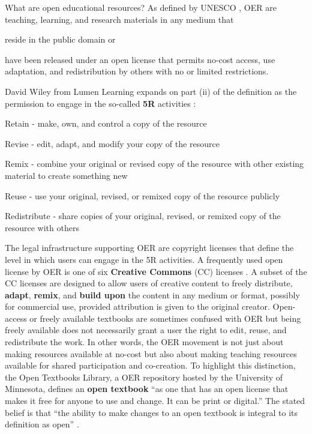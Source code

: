 \documentclass[11pt]{article}
\begin{document}
What are open educational resources?  As defined by UNESCO \cite{oerworldcongress}, OER are teaching, learning, and research materials in any medium that
\begin{compactenum}[(i)]
\item reside in the public domain or
\item have been released under an open license that permits no-cost access, use adaptation, and redistribution by others with no or limited restrictions.
\end{compactenum}
David Wiley from Lumen Learning expands on part (ii) of the definition as the permission to engage in the so-called \textbf{5R} activities \cite{wileynd}:
\begin{compactenum}[(i)]
  \item Retain - make, own, and control a copy of the resource
  \item Revise - edit, adapt, and modify your copy of the resource
  \item Remix - combine your original or revised copy of the resource with other existing material to create something new
  \item Reuse - use your original, revised, or remixed copy of the resource publicly
  \item Redistribute - share copies of your original, revised, or remixed copy of the resource with others
\end{compactenum}

The legal infrastructure supporting OER are copyright licenses that define the level in which users can engage in the 5R activities.  A frequently used open license by OER is one of six  \textbf{Creative Commons} (CC) licenses \cite{CClicenses:nd}.  A subset of the CC licenses are designed to allow users of creative content to freely distribute, \textbf{adapt}, \textbf{remix}, and \textbf{build upon} the content in any medium or format, possibly for commercial use, provided attribution is given to the original creator.  Open-access or freely available textbooks are sometimes confused with OER but being freely available does not necessarily grant a user the right to edit, reuse, and redistribute the work.  In other words, the OER movement is not just about making resources available at no-cost but also about making teaching resources available for shared participation and co-creation.  To highlight this distinction, the Open Textbooks Library, a OER repository hosted by the University of Minnesota, defines an \textbf{open textbook} ``as one that has an open license that makes it free for anyone to use and change. It can be print or digital.''  The stated belief is that ``the ability to make changes to an open textbook is integral to its definition as open'' \cite{opentextbooksfaq:nd}.
\end{document}
